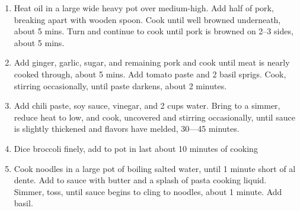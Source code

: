 \documentclass[]{report}
\begin{document}
            {\begin{enumerate}
                  \item  Heat oil in a large wide heavy pot over medium-high. Add half of pork, breaking apart with wooden spoon. Cook until well browned underneath, about 5 mins. Turn and continue to cook until pork is browned on 2--3 sides, about 5 mins.
                  \item Add ginger, garlic, sugar, and remaining pork and cook until meat is nearly cooked through, about 5 mins. Add tomato paste and 2 basil sprigs. Cook, stirring  occasionally, until paste darkens, about 2 minutes.
                  \item Add chili paste, soy sauce, vinegar, and 2 cups water. Bring to a simmer, reduce heat to low, and cook, uncovered and stirring occasionally, until sauce is slightly thickened and flavors have melded, 30—45 minutes.
                  \item Dice broccoli finely, add to pot in last about 10 minutes of cooking
                  \item Cook noodles in a large pot of boiling salted water, until 1 minute short of al dente. Add to sauce with butter and a splash of pasta cooking liquid. Simmer, toss, until sauce begins to cling to noodles, about 1 minute. Add basil.
            \end{enumerate}}    
\end{document}
